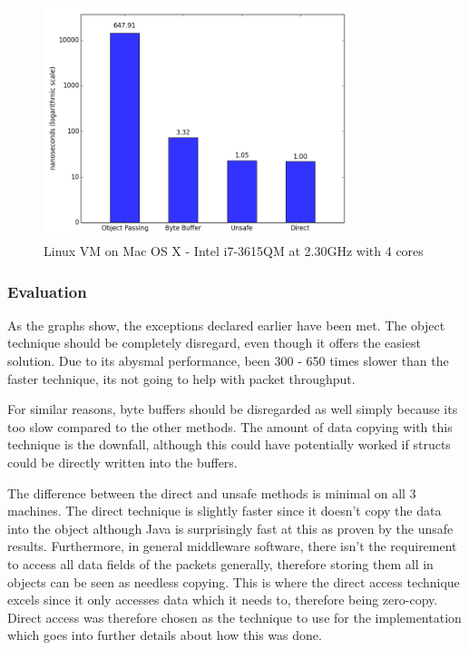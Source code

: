 \documentclass[final_report.tex]{subfiles}
\begin{document}
\begin{figure}[H]
	\centering
	\includegraphics[width=0.8\textwidth]{img/vm.png}
	\caption{Linux VM on Mac OS X - Intel i7-3615QM at 2.30GHz with 4 cores}
	\label{fig:res3}
\end{figure}

\subsubsection{Evaluation}
As the graphs show, the exceptions declared earlier have been met. The object technique should be completely disregard, even though it offers the easiest solution. Due to its abysmal performance, been 300 - 650 times slower than the faster technique, its not going to help with packet throughput.

For similar reasons, byte buffers should be disregarded as well simply because its too slow compared to the other methods. The amount of data copying with this technique is the downfall, although this could have potentially worked if structs could be directly written into the buffers.

The difference between the direct and unsafe methods is minimal on all 3 machines. The direct technique is slightly faster since it doesn't copy the data into the object although Java is surprisingly fast at this as proven by the unsafe results. Furthermore, in general middleware software, there isn't the requirement to access all data fields of the packets generally, therefore storing them all in objects can be seen as needless copying. This is where the direct access technique excels since it only accesses data which it needs to, therefore being zero-copy. Direct access was therefore chosen as the technique to use for the implementation which goes into further details about how this was done.
\end{document}
